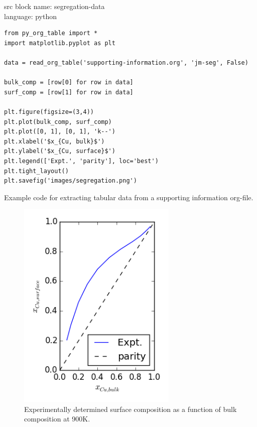 \documentclass[journal=accacs,manuscript=article,email=true]{achemso}
\begin{document}
\begin{tcolorbox}
src block name: segregation-data\\language: python\begin{listing}[H]
\begin{verbatim}
from py_org_table import *
import matplotlib.pyplot as plt

data = read_org_table('supporting-information.org', 'jm-seg', False)

bulk_comp = [row[0] for row in data]
surf_comp = [row[1] for row in data]

plt.figure(figsize=(3,4))
plt.plot(bulk_comp, surf_comp)
plt.plot([0, 1], [0, 1], 'k--')
plt.xlabel('$x_{Cu, bulk}$')
plt.ylabel('$x_{Cu, surface}$')
plt.legend(['Expt.', 'parity'], loc='best')
plt.tight_layout()
plt.savefig('images/segregation.png')
\end{verbatim}
\caption{\label{segregation-data}Example code for extracting tabular data from a supporting information org-file.}
\end{listing}
\end{tcolorbox}

\begin{figure}[htb]
\centering
\includegraphics[width=3in]{segregation}
\caption{Experimentally determined surface composition as a function of bulk composition at 900K. \label{fig-segregation}}
\end{figure}
\end{document}
